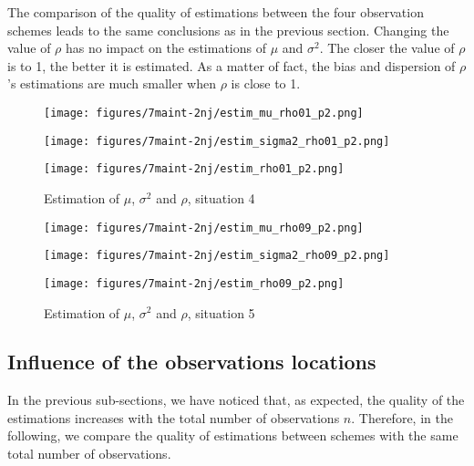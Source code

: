 The comparison of the quality of estimations between the four observation schemes leads to the same conclusions as in the previous section.
Changing the value of $\rho$ has no impact on the estimations of $\mu$ and $\sigma^2$. The closer the value of $\rho$ is to 1, the better it is estimated. As a matter of fact, the bias and dispersion of $\rho$'s estimations are much smaller when $\rho$ is close to 1.

\begin{figure}[h!]
\begin{multicols}{3}

\texttt{[image: figures/7maint-2nj/estim\_mu\_rho01\_p2.png]}\\
\columnbreak

\texttt{[image: figures/7maint-2nj/estim\_sigma2\_rho01\_p2.png]}  \\
\columnbreak

\texttt{[image: figures/7maint-2nj/estim\_rho01\_p2.png]}  

\end{multicols}
\vspace{-6mm}
\caption{Estimation of $\mu$, $\sigma^2$ and $\rho$, situation 4}
\label{estim3}
\end{figure} 


\begin{figure}[h!]
\begin{multicols}{3}

\texttt{[image: figures/7maint-2nj/estim\_mu\_rho09\_p2.png]} \\
\columnbreak

\texttt{[image: figures/7maint-2nj/estim\_sigma2\_rho09\_p2.png]}  \\
\columnbreak

\texttt{[image: figures/7maint-2nj/estim\_rho09\_p2.png]}  \\
\end{multicols}
\vspace{-6mm}
\caption{Estimation of $\mu$, $\sigma^2$ and $\rho$, situation 5}
\label{estim4}
\end{figure} 


\subsection{Influence of the observations locations}

In the previous sub-sections, we have noticed that, as expected, the quality of the estimations increases with the total number of observations $n$. Therefore, in the following, we compare the quality of estimations between schemes with the same total number of observations.

